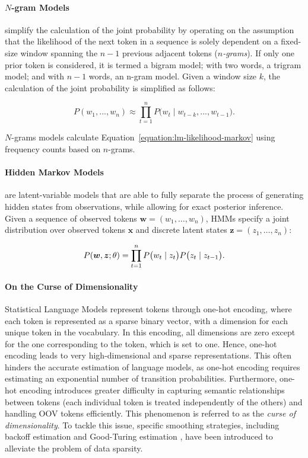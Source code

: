 \paragraph{$N$-gram Models} simplify the calculation of the joint probability by operating on the assumption that the likelihood of the next token in a sequence is solely dependent on a fixed-size window spanning the $n-1$ previous adjacent tokens (\textit{$n$-grams}). If only one prior token is considered, it is termed a bigram model; with two words, a trigram model; and with $n-1$ words, an n-gram model. Given a window size $k$, the calculation of the joint probability is simplified as follows:

\begin{equation}
    P(w_1, ..., w_n) \approx \prod_{t=1}^{n} P\bigl(w_t \mid w_{t-k}, ..., w_{t-1}\bigr).
    \label{equation:lm-likelihood-markov}
\end{equation}

$N$-grams models calculate Equation~\ref{equation:lm-likelihood-markov} using frequency counts based on $n$-grams. 

\paragraph{Hidden Markov Models} are latent-variable models that are able to fully separate the process of generating hidden states from observations, while allowing for exact posterior inference. Given a sequence of observed tokens $\bm{w} = (w_1, \ldots, w_n)$, \acp{HMM} specify a joint distribution over observed tokens $\bm{x}$ and discrete latent states $\bm{z} = (z_1, \ldots, z_n)$:

\begin{equation}
    P(\bm{w}, \bm{z}; \theta) = \prod_{t=1}^{n} P\bigl(w_t \mid z_t \bigr) P\bigl(z_t \mid z_{t-1} \bigr). \\
\end{equation}


\paragraph{On the Curse of Dimensionality} Statistical Language Models represent tokens through one-hot encoding, where each token is represented as a sparse binary vector, with a dimension for each unique token in the vocabulary. In this encoding, all dimensions are zero except for the one corresponding to the token, which is set to one. Hence, one-hot encoding leads to very high-dimensional and sparse representations. This often hinders the accurate estimation of language models, as one-hot encoding requires estimating an exponential number of transition probabilities. Furthermore, one-hot encoding introduces greater difficulty in capturing semantic relationships between tokens (each individual token is treated independently of the others) and handling \ac{OOV} tokens efficiently. This phenomenon is referred to as the \textit{curse of dimensionality}. To tackle this issue, specific smoothing strategies, including backoff estimation \citep{katz1987estimation} and Good-Turing estimation \citep{gale1995good}, have been introduced to alleviate the problem of data sparsity. \\

